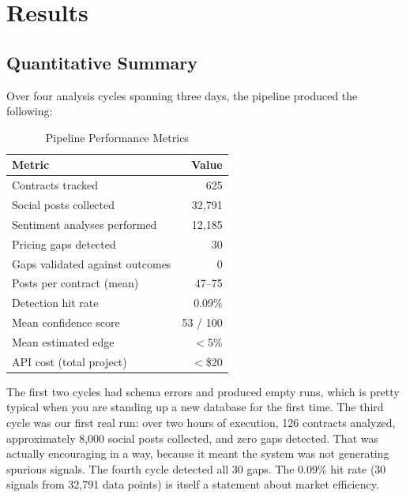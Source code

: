 \documentclass[conference]{IEEEtran}
\begin{document}
\section{Results}

\subsection{Quantitative Summary}

Over four analysis cycles spanning three days, the pipeline produced the following:

\begin{table}[H]
\centering
\caption{Pipeline Performance Metrics}
\begin{tabular}{@{}lr@{}}
\toprule
\textbf{Metric} & \textbf{Value} \\
\midrule
Contracts tracked & 625 \\
Social posts collected & 32,791 \\
Sentiment analyses performed & 12,185 \\
Pricing gaps detected & 30 \\
Gaps validated against outcomes & 0 \\
Posts per contract (mean) & 47--75 \\
Detection hit rate & 0.09\% \\
Mean confidence score & 53 / 100 \\
Mean estimated edge & $<$5\% \\
API cost (total project) & $<$\$20 \\
\bottomrule
\end{tabular}
\label{tab:results}
\end{table}

The first two cycles had schema errors and produced empty runs, which is pretty typical when you are standing up a new database for the first time. The third cycle was our first real run: over two hours of execution, 126 contracts analyzed, approximately 8,000 social posts collected, and zero gaps detected. That was actually encouraging in a way, because it meant the system was not generating spurious signals. The fourth cycle detected all 30 gaps. The 0.09\% hit rate (30 signals from 32,791 data points) is itself a statement about market efficiency.
\end{document}
